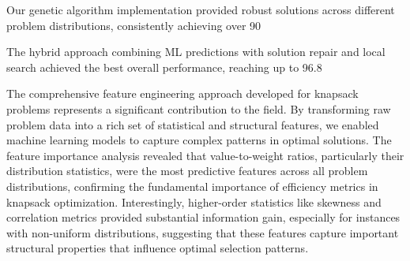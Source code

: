 \documentclass[conference, a4paper]{IEEEtran}
\begin{document}
Our genetic algorithm implementation provided robust solutions across different problem distributions, consistently achieving over 90%

The hybrid approach combining ML predictions with solution repair and local search achieved the best overall performance, reaching up to 96.8%

The comprehensive feature engineering approach developed for knapsack problems represents a significant contribution to the field. By transforming raw problem data into a rich set of statistical and structural features, we enabled machine learning models to capture complex patterns in optimal solutions. The feature importance analysis revealed that value-to-weight ratios, particularly their distribution statistics, were the most predictive features across all problem distributions, confirming the fundamental importance of efficiency metrics in knapsack optimization. Interestingly, higher-order statistics like skewness and correlation metrics provided substantial information gain, especially for instances with non-uniform distributions, suggesting that these features capture important structural properties that influence optimal selection patterns.
\end{document}
